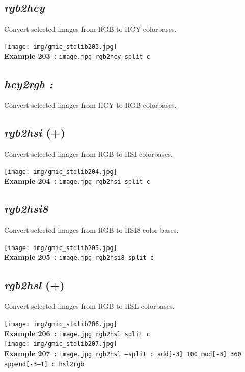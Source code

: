 \documentclass[a4paper,10.5pt,twoside]{book}
\begin{document}
\subsection{\emph{rgb2hcy} }\vspace*{-0.7em}
Convert selected images from RGB to HCY colorbases.
\begin{center}\texttt{[image: img/gmic\_stdlib203.jpg]}\\
{\footnotesize \textbf{Example 203~:} \texttt{image.jpg rgb2hcy split c}}
\end{center}

\subsection{\emph{hcy2rgb :} }\vspace*{-0.7em}
Convert selected images from HCY to RGB colorbases.


\subsection{\emph{rgb2hsi} (+)}\vspace*{-0.7em}
Convert selected images from RGB to HSI colorbases.
\begin{center}\texttt{[image: img/gmic\_stdlib204.jpg]}\\
{\footnotesize \textbf{Example 204~:} \texttt{image.jpg rgb2hsi split c}}
\end{center}

\subsection{\emph{rgb2hsi8} }\vspace*{-0.7em}
Convert selected images from RGB to HSI8 color bases.
\begin{center}\texttt{[image: img/gmic\_stdlib205.jpg]}\\
{\footnotesize \textbf{Example 205~:} \texttt{image.jpg rgb2hsi8 split c}}
\end{center}

\subsection{\emph{rgb2hsl} (+)}\vspace*{-0.7em}
Convert selected images from RGB to HSL colorbases.
\begin{center}\texttt{[image: img/gmic\_stdlib206.jpg]}\\
{\footnotesize \textbf{Example 206~:} \texttt{image.jpg rgb2hsl split c}}
\\\texttt{[image: img/gmic\_stdlib207.jpg]}\\
{\footnotesize \textbf{Example 207~:} \texttt{image.jpg rgb2hsl --split c add[-3] 100 mod[-3] 360 append[-3--1] c hsl2rgb}}
\end{center}
\end{document}
